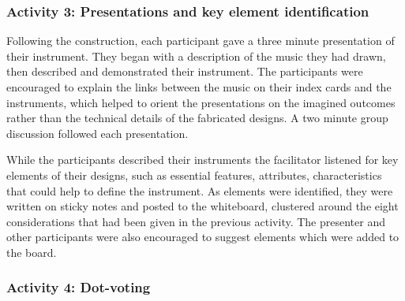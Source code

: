 \documentclass[letterpaper, 12pt]{article}
\begin{document}


\subsubsection{Activity 3: Presentations and key element identification}
\label{ch3-sec:activity-3-presentations}

Following the construction, each participant gave a three minute presentation of their instrument. They began with a description of the music they had drawn, then described and demonstrated their instrument. The participants were encouraged to explain the links between the music on their index cards and the instruments, which helped to orient the presentations on the imagined outcomes rather than the technical details of the fabricated designs. A two minute group discussion followed each presentation. 

While the participants described their instruments the facilitator listened for key elements of their designs, such as essential features, attributes, characteristics that could help to define the instrument. As elements were identified, they were written on sticky notes and posted to the whiteboard, clustered around the eight considerations that had been given in the previous activity. The presenter and other participants were also encouraged to suggest elements which were added to the board. 

\subsubsection{Activity 4: Dot-voting}
\label{ch3-sec:activity-4-dot-voting}
\end{document}
